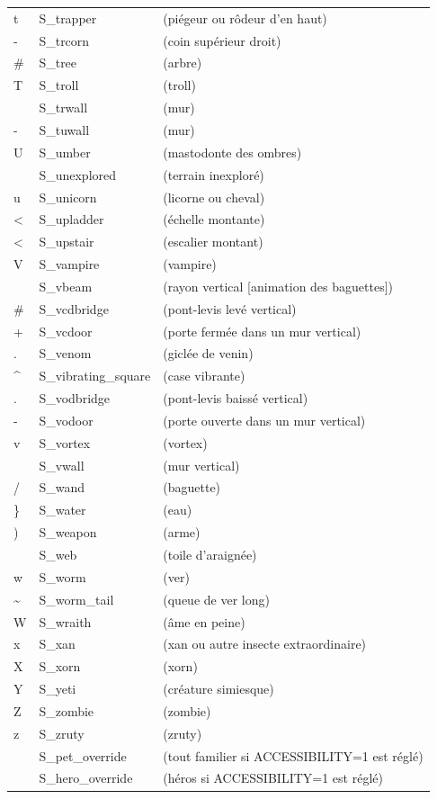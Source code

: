 \documentclass[titlepage]{article}
\begin{document}
\begin{longtable}{lll}
t & S\_trapper & (piégeur ou rôdeur d'en haut)\\
- & S\_trcorn & (coin supérieur droit)\\
\# & S\_tree & (arbre)\\
T & S\_troll & (troll)\\
\textbar{} & S\_trwall & (mur)\\
- & S\_tuwall & (mur)\\
U & S\_umber & (mastodonte des ombres)\\
~ & S\_unexplored & (terrain inexploré)\\
u & S\_unicorn & (licorne ou cheval)\\
\textless{} & S\_upladder & (échelle montante)\\
\textless{} & S\_upstair & (escalier montant)\\
V & S\_vampire & (vampire)\\
\textbar{} & S\_vbeam & (rayon vertical [animation des baguettes])\\
\# & S\_vcdbridge & (pont-levis levé vertical)\\
+ & S\_vcdoor & (porte fermée dans un mur vertical)\\
. & S\_venom & (giclée de venin)\\
\textasciicircum{} & S\_vibrating\_square & (case vibrante)\\
. & S\_vodbridge & (pont-levis baissé vertical)\\
- & S\_vodoor & (porte ouverte dans un mur vertical)\\
v & S\_vortex & (vortex)\\
\textbar{} & S\_vwall & (mur vertical)\\
/ & S\_wand & (baguette)\\
\} & S\_water & (eau)\\
) & S\_weapon & (arme)\\
\textquotedbl{} & S\_web & (toile d'araignée)\\
w & S\_worm & (ver)\\
\textasciitilde{} & S\_worm\_tail & (queue de ver long)\\
W & S\_wraith & (âme en peine)\\
x & S\_xan & (xan ou autre insecte extraordinaire)\\
X & S\_xorn & (xorn)\\
Y & S\_yeti & (créature simiesque)\\
Z & S\_zombie & (zombie)\\
z & S\_zruty & (zruty)\\
~ & S\_pet\_override & (tout familier si ACCESSIBILITY=1 est réglé)\\
~ & S\_hero\_override & (héros si ACCESSIBILITY=1 est réglé)\\
\end{longtable}
\end{document}
